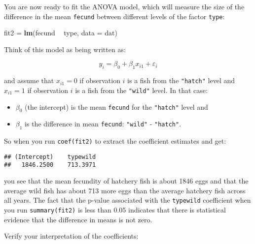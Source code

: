 \documentclass[]{book}
\newenvironment{Shaded}{\begin{snugshade}}{\end{snugshade}}
\newcommand{\KeywordTok}[1]{\textcolor[rgb]{0.13,0.29,0.53}{\textbf{#1}}}
\newcommand{\DataTypeTok}[1]{\textcolor[rgb]{0.13,0.29,0.53}{#1}}
\newcommand{\DecValTok}[1]{\textcolor[rgb]{0.00,0.00,0.81}{#1}}
\newcommand{\StringTok}[1]{\textcolor[rgb]{0.31,0.60,0.02}{#1}}
\newcommand{\CommentTok}[1]{\textcolor[rgb]{0.56,0.35,0.01}{\textit{#1}}}
\newcommand{\OperatorTok}[1]{\textcolor[rgb]{0.81,0.36,0.00}{\textbf{#1}}}
\newcommand{\NormalTok}[1]{#1}
\providecommand{\tightlist}{%
  \setlength{\itemsep}{0pt}\setlength{\parskip}{0pt}}
\theoremstyle{definition}
\theoremstyle{definition}
\theoremstyle{definition}
\theoremstyle{remark}
\begin{document}
You are now ready to fit the ANOVA model, which will measure the size of
the difference in the mean \texttt{fecund} between different levels of
the factor \texttt{type}:

\begin{Shaded}
\begin{Highlighting}[]
\NormalTok{fit2 =}\StringTok{ }\KeywordTok{lm}\NormalTok{(fecund }\OperatorTok{~}\StringTok{ }\NormalTok{type, }\DataTypeTok{data =}\NormalTok{ dat)}
\end{Highlighting}
\end{Shaded}

Think of this model as being written as:

\begin{equation}
  y_i=\beta_0 + \beta_1 x_{i1} + \varepsilon_i
\label{eq:anova}
\end{equation}

and assume that \(x_{i1} = 0\) if observation \(i\) is a fish from the
\texttt{"hatch"} level and \(x_{i1} = 1\) if observation \(i\) is a fish
from the \texttt{"wild"} level. In that case:

\begin{itemize}
\tightlist
\item
  \(\beta_0\) (the intercept) is the mean \texttt{fecund} for the
  \texttt{"hatch"} level and
\item
  \(\beta_1\) is the difference in mean \texttt{fecund}: \texttt{"wild"}
  - \texttt{"hatch"}.
\end{itemize}

So when you run \texttt{coef(fit2)} to extract the coefficient estimates
and get:

\begin{verbatim}
## (Intercept)    typewild 
##   1846.2500    713.3971
\end{verbatim}

you see that the mean fecundity of hatchery fish is about 1846 eggs and
that the average wild fish has about 713 more eggs than the average
hatchery fish across all years. The fact that the p-value associated
with the \texttt{typewild} coefficient when you run
\texttt{summary(fit2)} is less than 0.05 indicates that there is
statistical evidence that the difference in means is not zero.

Verify your interpretation of the coefficients:

\begin{Shaded}
\end{Shaded}
\end{document}
